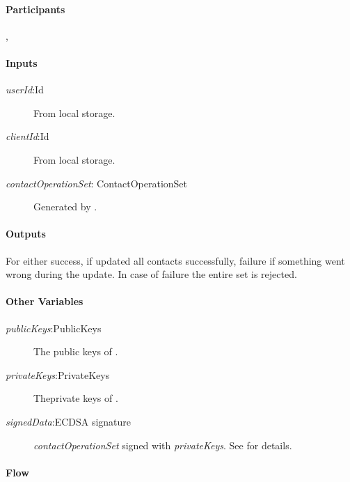 \documentclass[a4paper,10pt]{article}
\newcommand{\signedData}{\emph{signedData}}
\newcommand{\privateKeys}{\emph{privateKeys}}
\newcommand{\publicKeys}{\emph{publicKeys}}
\newcommand{\userId}{\emph{userId}}
\newcommand{\clientId}{\emph{clientId}}
\newcommand{\contactOperationSet}{\emph{contactOperationSet}}
\begin{document}
\paragraph{Participants} \Client{}, \Server{}

\paragraph{Inputs}
\SpecialItem
\begin{description}
 \item[\userId{}:Id] From \Client{} local storage.
 \item[\clientId{}:Id] From \Client{} local storage.
 \item[\contactOperationSet{}: ContactOperationSet] Generated by \Client{}.
\end{description}

\paragraph{Outputs}
For \Client{} either success, if \Server{} updated all contacts successfully, failure if something went wrong during the update. In case of failure the entire set is rejected.

\paragraph{Other Variables}
\SpecialItem
\begin{description}
 \item[\publicKeys{}:PublicKeys] The public keys of  \Client{}. 
 \item[\privateKeys{}:PrivateKeys] Theprivate keys of \Client{}.
 \item[\signedData{}:ECDSA signature] \contactOperationSet{} signed with
\privateKeys{}. See \cite{crypto_spec} for details.
\end{description}

\paragraph{Flow}
\end{document}
